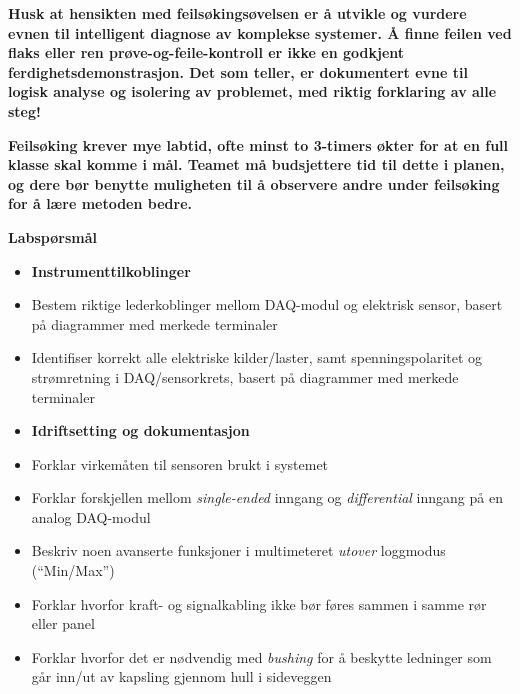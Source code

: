 \vskip 10pt

{\bf Husk at hensikten med feilsøkingsøvelsen er å utvikle og vurdere evnen til intelligent diagnose av komplekse systemer. Å finne feilen ved flaks eller ren prøve-og-feile-kontroll er ikke en godkjent ferdighetsdemonstrasjon. Det som teller, er dokumentert evne til logisk analyse og isolering av problemet, med riktig forklaring av alle steg!}

\vskip 10pt

{\bf Feilsøking krever mye labtid, ofte minst to 3-timers økter for at en full klasse skal komme i mål. Teamet må budsjettere tid til dette i planen, og dere bør benytte muligheten til å observere andre under feilsøking for å lære metoden bedre.}



\vfil \eject

\noindent
{\bf Labspørsmål}

\vskip 5pt

\begin{itemize}
\item{} {\bf Instrumenttilkoblinger}
\item{} Bestem riktige lederkoblinger mellom DAQ-modul og elektrisk sensor, basert på diagrammer med merkede terminaler
\item{} Identifiser korrekt alle elektriske kilder/laster, samt spenningspolaritet og strømretning i DAQ/sensorkrets, basert på diagrammer med merkede terminaler
\end{itemize}

\filbreak

\begin{itemize}
\item{} {\bf Idriftsetting og dokumentasjon}
\item{} Forklar virkemåten til sensoren brukt i systemet
\item{} Forklar forskjellen mellom {\it single-ended} inngang og {\it differential} inngang på en analog DAQ-modul
\item{} Beskriv noen avanserte funksjoner i multimeteret {\it utover} loggmodus (``Min/Max'')
\item{} Forklar hvorfor kraft- og signalkabling ikke bør føres sammen i samme rør eller panel
\item{} Forklar hvorfor det er nødvendig med {\it bushing} for å beskytte ledninger som går inn/ut av kapsling gjennom hull i sideveggen
\end{itemize}

\filbreak

